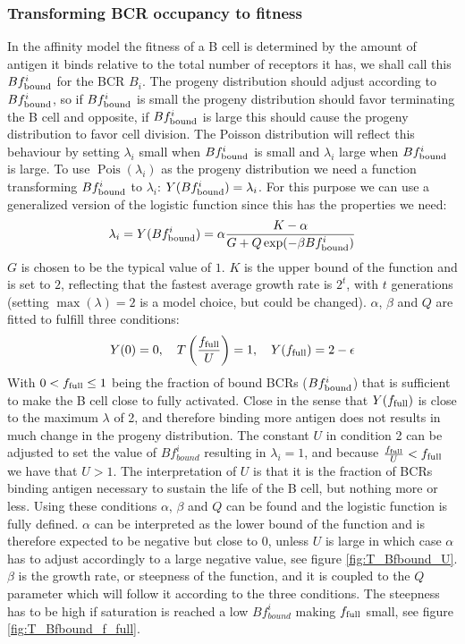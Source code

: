 \subsubsection{Transforming BCR occupancy to fitness}
In the affinity model the fitness of a B cell is determined by the amount of antigen it binds relative to the total number of receptors it has, we shall call this $Bf^i_{\text{bound}}$ for the BCR $B_i$.
The progeny distribution should adjust according to $Bf^i_{\text{bound}}$, so if $Bf^i_{\text{bound}}$ is small the progeny distribution should favor terminating the B cell and opposite, if $Bf^i_{\text{bound}}$ is large this should cause the progeny distribution to favor cell division.
The Poisson distribution will reflect this behaviour by setting $\lambda_i$ small when $Bf^i_{\text{bound}}$ is small and $\lambda_i$ large when $Bf^i_{\text{bound}}$ is large.
To use $\operatorname{Pois}(\lambda_i)$ as the progeny distribution we need a function transforming $Bf^i_{\text{bound}}$ to $\lambda_i$: $Y(Bf^i_{\text{bound}}) = \lambda_i$.
For this purpose we can use a generalized version of the logistic function since this has the properties we need:
\begin{equation}
\lambda_i = Y(Bf^i_{\text{bound}}) = \alpha \frac{K - \alpha}{G + Q \exp(-\beta Bf^i_{\text{bound}})}
  \label{eq:BA_trans}
\end{equation}
$G$ is chosen to be the typical value of $1$.
$K$ is the upper bound of the function and is set to $2$, reflecting that the fastest average growth rate is $2^t$, with $t$ generations (setting $\operatorname{max}(\lambda) = 2$ is a model choice, but could be changed).
$\alpha$, $\beta$ and $Q$ are fitted to fulfill three conditions:
\begin{equation}
Y(0) = 0, \ \ \ T \left(\frac{f_{\text{full}}}{U} \right) = 1, \ \ \ Y(f_{\text{full}}) = 2 - \epsilon
  \label{eq:BA_cond}
\end{equation}
With $0 < f_{\text{full}} \leq 1$ being the fraction of bound BCRs ($Bf^i_{\text{bound}}$) that is sufficient to make the B cell close to fully activated.
Close in the sense that $Y(f_{\text{full}})$ is close to the maximum $\lambda$ of 2, and therefore binding more antigen does not results in much change in the progeny distribution.
The constant $U$ in condition 2 can be adjusted to set the value of $Bf^i_{bound}$ resulting in $\lambda_i = 1$, and because $\frac{f_{\text{full}}}{U} < f_{\text{full}}$ we have that $U > 1$.
The interpretation of $U$ is that it is the fraction of BCRs binding antigen necessary to sustain the life of the B cell, but nothing more or less.
Using these conditions $\alpha$, $\beta$ and $Q$ can be found and the logistic function is fully defined.
$\alpha$ can be interpreted as the lower bound of the function and is therefore expected to be negative but close to 0, unless $U$ is large in which case $\alpha$ has to adjust accordingly to a large negative value, see figure \ref{fig:T_Bfbound_U}.
$\beta$ is the growth rate, or steepness of the function, and it is coupled to the $Q$ parameter which will follow it according to the three conditions.
The steepness has to be high if saturation is reached a low $Bf^i_{bound}$ making $f_{\text{full}}$ small, see figure \ref{fig:T_Bfbound_f_full}.
\vfill

